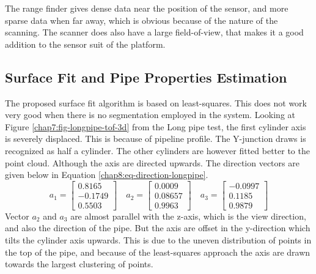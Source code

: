 The range finder gives dense data near the position of the sensor, and more sparse data
when far away, which is obvious because of the nature of the scanning. The scanner does
also have a large field-of-view, that makes it a good addition to the sensor suit of the
platform. 


\subsection{Surface Fit and Pipe Properties Estimation}
The proposed surface fit algorithm is based on least-squares. This does not work very good
when there is no segmentation employed in the system. Looking at Figure
\ref{chap7:fig-longpipe-tof-3d} from the Long pipe test, the first cylinder axis is severely displaced. This
is because of pipeline profile. The Y-junction draws is recognized as half a cylinder. The
other cylinders are however fitted better to the point cloud. Although the axis are
directed upwards. The direction vectors are given below in Equation
\eqref{chap8:eq-direction-longpipe}. 
\begin{equation}
    \label{chap8:eq-direction-longpipe}
    a_1 = \left[ \begin{matrix}
                        0.8165\\
                       -0.1749\\
                       0.5503 
                 \end{matrix} \right] \quad a_2 = \left [
                 \begin{matrix}
                       0.0009\\
                       0.08657\\
                       0.9963
                 \end{matrix} \right] \quad a_3 = \left [
                 \begin{matrix}
                       -0.0997\\
                       0.1185\\
                       0.9879
                 \end{matrix} \right]
\end{equation}
Vector $a_2$ and $a_3$ are almost parallel with the z-axis, which is the view direction,
and also the direction of the pipe. But the axis are offset in the y-direction which tilts
the cylinder axis upwards. This is due to the uneven distribution of points in the top of
the pipe, and because of the least-squares approach the axis are drawn towards the largest
clustering of points. 

